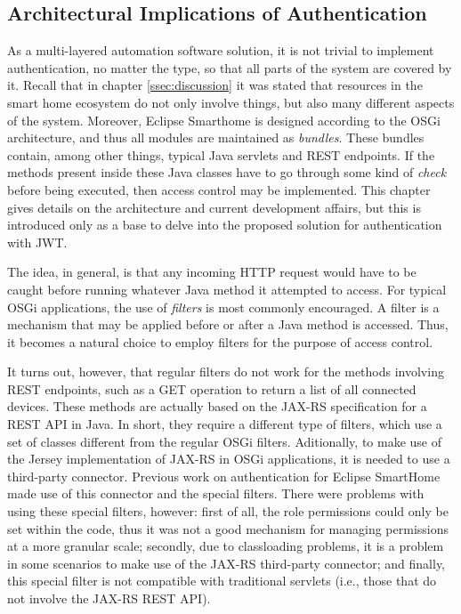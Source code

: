 \documentclass[12pt]{article}
\begin{document}
\subsection{Architectural Implications of Authentication}

As a multi-layered automation software solution, it is not trivial to implement authentication, no matter the type, so that all parts of the system are covered by it. Recall that in chapter \ref{ssec:discussion} it was stated that resources in the smart home ecosystem do not only involve things, but also many different aspects of the system. Moreover, Eclipse Smarthome is designed according to the OSGi architecture, and thus all modules are maintained as \emph{bundles}. These bundles contain, among other things, typical Java servlets and REST endpoints. If the methods present inside these Java classes have to go through some kind of \emph{check} before being executed, then access control may be implemented. This chapter gives details on the architecture and current development affairs, but this is introduced only as a base to delve into the proposed solution for authentication with JWT.

The idea, in general, is that any incoming HTTP request would have to be caught before running whatever Java method it attempted to access. For typical OSGi applications, the use of \emph{filters} is most commonly encouraged. A filter is a mechanism that may be applied before or after a Java method is accessed. Thus, it becomes a natural choice to employ filters for the purpose of access control.

It turns out, however, that regular filters do not work for the methods involving REST endpoints, such as a GET operation to return a list of all connected devices. These methods are actually based on the JAX-RS specification for a REST API in Java. In short, they require a different type of filters, which use a set of classes different from the regular OSGi filters. Aditionally, to make use of the Jersey implementation of JAX-RS in OSGi applications, it is needed to use a third-party connector. Previous work on authentication for Eclipse SmartHome made use of this connector and the special filters. There were problems with using these special filters, however: first of all, the role permissions could only be set within the code, thus it was not a good mechanism for managing permissions at a more granular scale; secondly, due to classloading problems, it is a problem in some scenarios to make use of the JAX-RS third-party connector; and finally, this special filter is not compatible with traditional servlets (i.e., those that do not involve the JAX-RS REST API).
\end{document}
